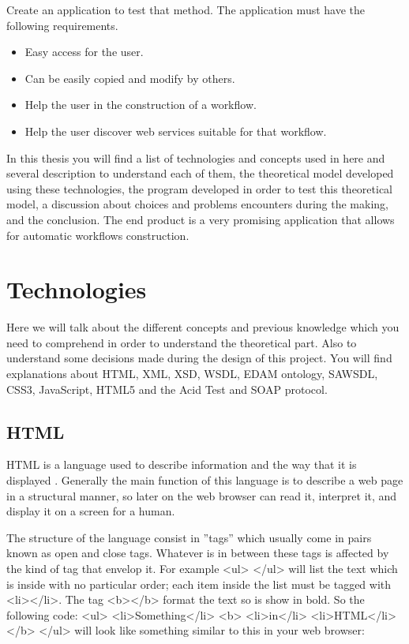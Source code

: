 \documentclass[a4paper,10pt]{article}
\begin{document}
Create an application to test that method. The application must have the following requirements.

\begin{itemize}
  \item Easy access for the user.
  \item Can be easily copied and modify by others.
  \item Help the user in the construction of a workflow.
  \item Help the user discover web services suitable for that workflow.
\end{itemize}

In this thesis you will find a list of technologies and concepts used in here and several description to understand each of them, the theoretical model developed using these technologies, the program developed in order to test this theoretical model, a discussion about choices and problems encounters during the making, and the conclusion. The end product is a very promising application that allows for automatic workflows construction.\vspace{3 mm}

\newpage

\section{Technologies}
\label{chap:technologies}

Here we will talk about the different concepts and previous knowledge which you need to comprehend in order to understand the theoretical part. Also to understand some decisions made during the design of this project. You will find explanations about HTML, XML, XSD, WSDL, EDAM ontology, SAWSDL, CSS3, JavaScript, HTML5 and the Acid Test and SOAP protocol.

  \subsection{HTML}

  HTML is a language used to describe information and the way that it is displayed \cite{html}. Generally the main function of this language is to describe a web page in a structural manner, so later on the web browser can read it, interpret it, and display it on a screen for a human.\vspace{3 mm}

  The structure of the language consist in ''tags'' which usually come in pairs known as open and close tags. Whatever is in between these tags is affected by the kind of tag that envelop it. For example <ul> </ul>  will list the text which is inside with no particular order; each item inside the list must be tagged with <li></li>. The tag <b></b> format the text so is show in bold. So the following code: <ul> <li>Something</li> <b> <li>in</li> <li>HTML</li> </b> </ul>  will look like something similar to this in your web browser:
\end{document}
